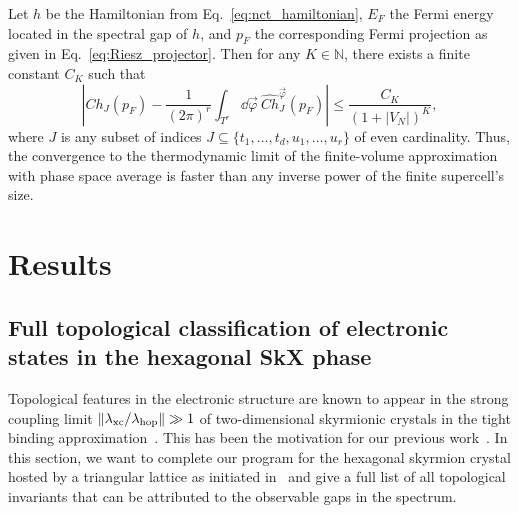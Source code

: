 \documentclass[submission, Phys]{SciPost}
\begin{document}
Let $h$ be the Hamiltonian from Eq.~\eqref{eq:nct_hamiltonian}, $E_F$ the Fermi energy located in the spectral gap of $h$, and $p_F$ the corresponding Fermi projection as given in Eq.~\eqref{eq:Riesz_projector}.
Then for any $K\in \mathbb{N}$, there exists a finite constant $C_K$ such that
\begin{equation}
    | Ch_J(p_F) - \frac{1}{(2\pi)^{r}} \int_{T^r}\dd \vec{\varphi} ~ \hat{Ch}^{\vec{\varphi}}_J(p_F) | \leq \frac{C_K}{(1+|V_N|)^K},
\end{equation}
where $J$ is any subset of indices $J\subseteq\{t_1, \ldots, t_d, u_1, \ldots, u_r\}$ of even cardinality.
Thus, the convergence to the thermodynamic limit of the finite-volume approximation with phase space average is faster than any inverse power of the finite supercell's size.

\section{Results}
\label{sec:results}

\subsection{Full topological classification of electronic states in the hexagonal SkX phase}

Topological features in the electronic structure are known to appear in the strong coupling limit $\| \lambda_\mathrm{xc} /\lambda_\mathrm{hop}\| \gg 1$ of two-dimensional skyrmionic crystals in the tight binding approximation~\cite{Hamamoto2015}.
This has been the motivation for our previous work~\cite{Lux2024}.
In this section, we want to complete our program for the hexagonal skyrmion crystal hosted by a triangular lattice as initiated in~\cite{Lux2024} and give a full list of all topological invariants that can be attributed to the observable gaps in the spectrum.
\end{document}
